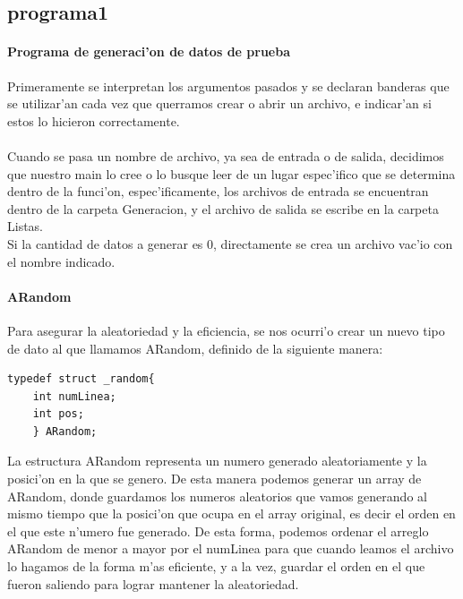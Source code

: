 \documentclass{article}
\begin{document}
	\subsection{programa1}
	\paragraph{Programa de generaci'on de datos de prueba}
	Primeramente se interpretan los argumentos pasados y se declaran banderas que se utilizar'an cada vez que querramos crear o abrir un archivo, e indicar'an si estos lo hicieron correctamente.
	\paragraph{} 
	Cuando se pasa un nombre de archivo, ya sea de entrada o de salida, decidimos que nuestro main lo cree o lo busque leer de un lugar espec'ifico que se determina dentro de la funci'on, espec'ificamente, los archivos de entrada se encuentran dentro de la carpeta Generacion, y el archivo de salida se escribe en la carpeta Listas.
	\\
	Si la cantidad de datos a generar es 0, directamente se crea un archivo vac'io con el nombre indicado.
	\\
	\paragraph{ARandom} Para asegurar la aleatoriedad y la eficiencia, se nos ocurri'o crear un nuevo tipo de dato al que llamamos ARandom, definido de la siguiente manera:
	\begin{lstlisting}[style=CStyle]
	typedef struct _random{
	int numLinea;
	int pos;
	} ARandom;
	\end{lstlisting}
	La estructura ARandom representa un numero generado aleatoriamente y la posici'on en la que se genero. De esta manera podemos generar un array de ARandom, donde guardamos los numeros aleatorios que vamos generando al mismo tiempo que la posici'on que ocupa en el array original, es decir el orden en el que este n'umero fue generado. De esta forma, podemos ordenar el arreglo ARandom de menor a mayor por el numLinea para que cuando leamos el archivo lo hagamos de la forma m'as eficiente, y a la vez, guardar el orden en el que fueron saliendo para lograr mantener la aleatoriedad.
	
\end{document}
